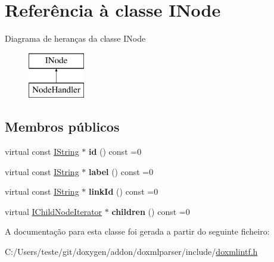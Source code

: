 \hypertarget{class_i_node}{\section{Referência à classe I\-Node}
\label{class_i_node}
}
Diagrama de heranças da classe I\-Node\begin{figure}[H]
\begin{center}
\leavevmode
\includegraphics[height=2.000000cm]{class_i_node}
\end{center}
\end{figure}
\subsection*{Membros públicos}
\begin{DoxyCompactItemize}
\item 
\hypertarget{class_i_node_aaba28daa272dce8bc14dde330d5b0126}{virtual const \hyperlink{class_i_string}{I\-String} $\ast$ {\bfseries id} () const =0}\label{class_i_node_aaba28daa272dce8bc14dde330d5b0126}

\item 
\hypertarget{class_i_node_adff3c8a34a7b7f000c1a12aaf919b5f7}{virtual const \hyperlink{class_i_string}{I\-String} $\ast$ {\bfseries label} () const =0}\label{class_i_node_adff3c8a34a7b7f000c1a12aaf919b5f7}

\item 
\hypertarget{class_i_node_a63e11f2f5883efabd53e1b6fee520f77}{virtual const \hyperlink{class_i_string}{I\-String} $\ast$ {\bfseries link\-Id} () const =0}\label{class_i_node_a63e11f2f5883efabd53e1b6fee520f77}

\item 
\hypertarget{class_i_node_a06b6c9e2cf39a46aec539347df731f5e}{virtual \hyperlink{class_i_child_node_iterator}{I\-Child\-Node\-Iterator} $\ast$ {\bfseries children} () const =0}\label{class_i_node_a06b6c9e2cf39a46aec539347df731f5e}

\end{DoxyCompactItemize}


A documentação para esta classe foi gerada a partir do seguinte ficheiro\-:\begin{DoxyCompactItemize}
\item 
C\-:/\-Users/teste/git/doxygen/addon/doxmlparser/include/\hyperlink{include_2doxmlintf_8h}{doxmlintf.\-h}\end{DoxyCompactItemize}
